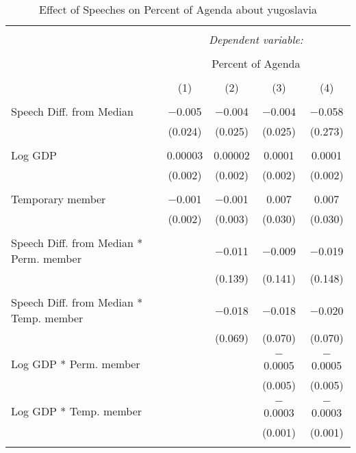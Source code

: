
\begin{table}[!htbp] \centering 
  \caption{Effect of Speeches on Percent of Agenda about yugoslavia} 
  \label{} 
\begin{tabular}{@{\extracolsep{5pt}}lcccc} 
\\[-1.8ex]\hline 
\hline \\[-1.8ex] 
 & \multicolumn{4}{c}{\textit{Dependent variable:}} \\ 
\cline{2-5} 
\\[-1.8ex] & \multicolumn{4}{c}{Percent of Agenda} \\ 
\\[-1.8ex] & (1) & (2) & (3) & (4)\\ 
\hline \\[-1.8ex] 
 Speech Diff. from Median & $-$0.005 & $-$0.004 & $-$0.004 & $-$0.058 \\ 
  & (0.024) & (0.025) & (0.025) & (0.273) \\ 
  & & & & \\ 
 Log GDP & 0.00003 & 0.00002 & 0.0001 & 0.0001 \\ 
  & (0.002) & (0.002) & (0.002) & (0.002) \\ 
  & & & & \\ 
 Temporary member & $-$0.001 & $-$0.001 & 0.007 & 0.007 \\ 
  & (0.002) & (0.003) & (0.030) & (0.030) \\ 
  & & & & \\ 
 Speech Diff. from Median * Perm. member &  & $-$0.011 & $-$0.009 & $-$0.019 \\ 
  &  & (0.139) & (0.141) & (0.148) \\ 
  & & & & \\ 
 Speech Diff. from Median * Temp. member &  & $-$0.018 & $-$0.018 & $-$0.020 \\ 
  &  & (0.069) & (0.070) & (0.070) \\ 
  & & & & \\ 
 Log GDP * Perm. member &  &  & $-$0.0005 & $-$0.0005 \\ 
  &  &  & (0.005) & (0.005) \\ 
  & & & & \\ 
 Log GDP * Temp. member &  &  & $-$0.0003 & $-$0.0003 \\ 
  &  &  & (0.001) & (0.001) \\ 
  & & & & \\ 

\end{tabular}
\end{table}
